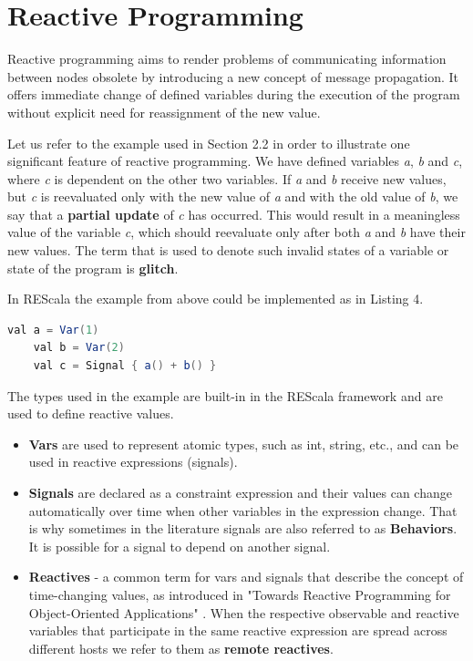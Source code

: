 \documentclass{sigplanconf}
\begin{document}
\section{Reactive Programming}

Reactive programming aims to render problems of communicating information between nodes obsolete by introducing a new concept of message propagation. It offers immediate change of defined variables during the execution of the program without explicit need for reassignment of the new value.

Let us refer to the example used in Section 2.2 in order to illustrate one significant feature of reactive programming. We have defined variables \textit{a}, \textit{b} and \textit{c}, where \textit{c}  is dependent on the other two variables. If \textit{a} and \textit{b} receive new values, but \textit{c} is reevaluated only with the new value of \textit{a} and with the old value of \textit{b}, we say that a \textbf{partial update} of \textit{c} has occurred. This would result in a meaningless value of the variable \textit{c}, which should reevaluate only after both \textit{a} and \textit{b} have their new values. The term that is used to denote such invalid states of a variable or state of the program is \textbf{glitch}.

In REScala the example from above could be implemented as in Listing 4.

\begin{lstlisting}[frame=single,caption={Reactive Sum},captionpos=b,linewidth=\columnwidth, basicstyle=\small, language=java, morekeywords={val, Signal}, keywordstyle=\color{blue}]
	val a = Var(1)
	val b = Var(2)
	val c = Signal { a() + b() }
\end{lstlisting}

The types used in the example are built-in in the REScala framework and are used to define reactive values.

\begin{itemize} \itemsep1pt \parskip0pt 
  \item \textbf{Vars} are used to represent atomic types, such as int, string, etc., and can be used in reactive expressions (signals).
  \item \textbf{Signals} are declared as a constraint expression and their values can change automatically over time when other variables in the expression change. That is why sometimes in the literature signals are also referred to as \textbf{Behaviors}. It is possible for a signal to depend on another signal. 
  \item \textbf{Reactives} - a common term for vars and signals that describe the concept of time-changing values, as introduced in "Towards Reactive Programming for Object-Oriented Applications" \cite{towards}. When the respective observable and reactive variables that participate in the same reactive expression are spread across different hosts we refer to them as \textbf{remote reactives}.

\end{itemize}
\end{document}
